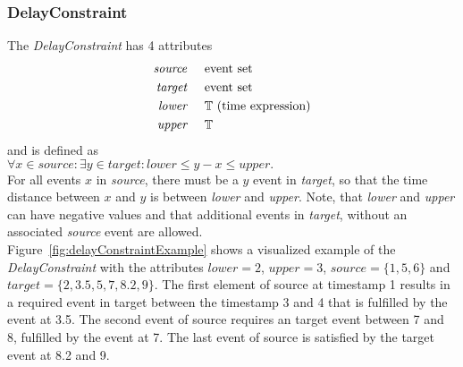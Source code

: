 	\subsubsection{DelayConstraint}
		The \emph{DelayConstraint} has 4 attributes
		\begin{align*}
			\emph{source} & \hspace{.5cm}\text{event set}\\
			\emph{target} & \hspace{.5cm}\text{event set}\\
			\emph{lower}  & \hspace{.5cm}\text{$\mathbb{T}$ (time expression)}\\
			\emph{upper}  & \hspace{.5cm}\text{$\mathbb{T}$}
		\end{align*}
		and is defined as\\[10pt]
		\begin{math}
			\forall x\in source:\exists y\in target: lower\leq y-x\leq upper.
		\end{math}\\[10pt]
		For all events $x$ in \emph{source}, there must be a $y$ event in \emph{target}, so that the time distance between $x$ and $y$ is between \emph{lower} and \emph{upper}. Note, that \emph{lower} and \emph{upper} can have negative values and that additional events in \emph{target}, without an associated \emph{source} event are allowed.\\
		Figure~\ref{fig:delayConstraintExample} shows a visualized example of the \emph{DelayConstraint} with the attributes $lower=2$, $upper=3$, $source=\{1, 5, 6\}$ and $target=\{2, 3.5, 5, 7, 8.2, 9\}$. The first element of source at timestamp 1 results in a required event in target between the timestamp 3 and 4 that is fulfilled by the event at 3.5. The second event of source requires an target event between 7 and 8, fulfilled by the event at 7. The last event of source is satisfied by the target event at 8.2 and 9.
